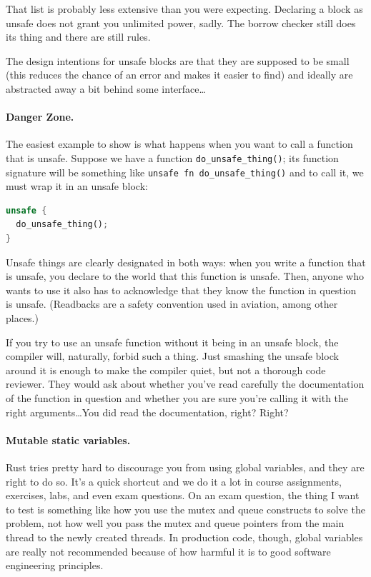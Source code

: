 \documentclass[a4paper]{report}
\begin{document}
That list is probably less extensive than you were expecting. Declaring a block as unsafe does not grant you unlimited power, sadly. The borrow checker still does its thing and there are still rules. 

The design intentions for unsafe blocks are that they are supposed to be small (this reduces the chance of an error and makes it easier to find) and ideally are abstracted away a bit behind some interface\ldots

\paragraph{Danger Zone.} The easiest example to show is what happens when you want to call a function that is unsafe. Suppose we have a function \texttt{do\_unsafe\_thing()}; its function signature will be something like \texttt{unsafe fn do\_unsafe\_thing()} and to call it, we must wrap it in an unsafe block:

\begin{lstlisting}[language=Rust]
unsafe {
  do_unsafe_thing();
}
\end{lstlisting}

Unsafe things are clearly designated in both ways: when you write a function that is unsafe, you declare to the world that this function is unsafe. Then, anyone who wants to use it also has to acknowledge that they know the function in question is unsafe. (Readbacks are a safety convention used in aviation, among other places.)

If you try to use an unsafe function without it being in an unsafe block, the compiler will, naturally, forbid such a thing. Just smashing the unsafe block around it is enough to make the compiler quiet, but not a thorough code reviewer. They would ask about whether you've read carefully the documentation of the function in question and whether you are sure you're calling it with the right arguments\ldots You did read the documentation, right? Right?

\paragraph{Mutable static variables.} Rust tries pretty hard to discourage you from using global variables, and they are right to do so. It's a quick shortcut and we do it a lot in course assignments, exercises, labs, and even exam questions. On an exam question, the thing I want to test is something like how you use the mutex and queue constructs to solve the problem, not how well you pass the mutex and queue pointers from the main thread to the newly created threads. In production code, though, global variables are really not recommended because of how harmful it is to good software engineering principles. 
\end{document}
